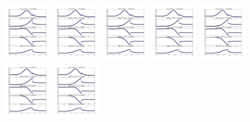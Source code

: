 \documentclass[11pt]{article}
\begin{document}
\vskip 10pt 
\includegraphics[width=0.19\textwidth]{frame0118fig1.png}
\vskip 10pt 
\includegraphics[width=0.19\textwidth]{frame0119fig1.png}
\vskip 10pt 
\includegraphics[width=0.19\textwidth]{frame0120fig1.png}
\vskip 10pt 
\includegraphics[width=0.19\textwidth]{frame0121fig1.png}
\vskip 10pt 
\includegraphics[width=0.19\textwidth]{frame0122fig1.png}
\vskip 10pt 
\includegraphics[width=0.19\textwidth]{frame0123fig1.png}
\vskip 10pt 
\includegraphics[width=0.19\textwidth]{frame0124fig1.png}
\end{document}
